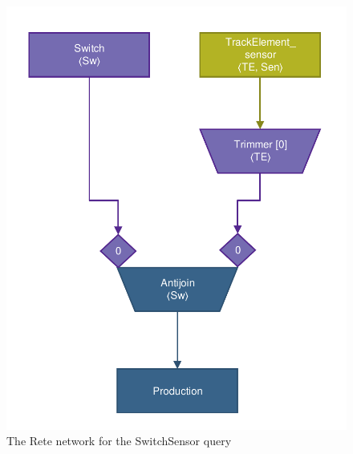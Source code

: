 \begin{figure}[Htb]
\begin{center}
\includegraphics[scale=0.5]{figures/rete-switchsensor-layout.pdf}
\caption{The Rete network for the \textsf{SwitchSensor} query} 
\label{fig:rete-switchsensor-layout}
\end{center}
\end{figure}
